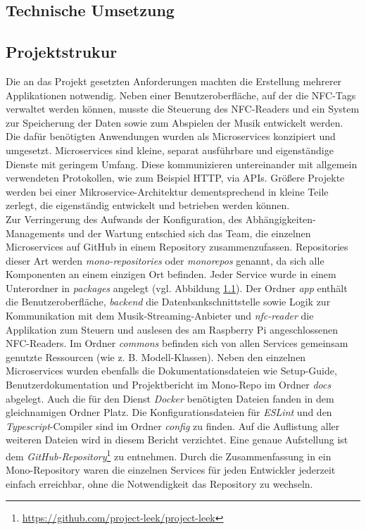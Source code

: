 \documentclass[10pt, a4paper]{article}
\begin{document}
\begin{onehalfspace}
\section{Technische Umsetzung}
  \subsection{Projektstrukur}
  \label{Ordnerstruktur}
  Die an das Projekt gesetzten Anforderungen machten die Erstellung mehrerer Applikationen notwendig. Neben einer Benutzeroberfläche, auf der die NFC-Tags
  verwaltet werden können, musste die Steuerung des NFC-Readers und ein System zur Speicherung der Daten sowie zum Abspielen der Musik entwickelt werden.
  Die dafür benötigten Anwendungen wurden als Microservices konzipiert und umgesetzt.
  Microservices sind kleine, separat ausführbare und eigenständige Dienste mit geringem Umfang.
  Diese kommunizieren untereinander mit allgemein verwendeten Protokollen, wie zum Beispiel HTTP, via APIs.
  Größere Projekte werden bei einer Mikroservice-Architektur dementsprechend in kleine Teile \glqq zerlegt\grqq ,
   die eigenständig entwickelt und betrieben werden können. \cite{Microservices}\\
  Zur Verringerung des Aufwands der Konfiguration, des Abhängigkeiten-Managements und der Wartung entschied sich das Team, die einzelnen Microservices auf GitHub in einem Repository zusammenzufassen. \cite{Monorepo}
  Repositories dieser Art werden \textit{mono-repositories} oder \textit{monorepos} genannt, da sich alle Komponenten an einem einzigen Ort befinden.
  Jeder Service wurde in einem Unterordner in \textit{packages} angelegt (vgl. Abbildung \ref*{Ordnerstruktur}). Der Ordner \textit{app} enthält die Benutzeroberfläche,
  \textit{backend} die Datenbankschnittstelle sowie Logik zur Kommunikation mit dem Musik-Streaming-Anbieter und \textit{nfc-reader} die Applikation zum Steuern und auslesen des am Raspberry Pi angeschlossenen NFC-Readers.
  Im Ordner \textit{commons} befinden sich von allen Services gemeinsam genutzte Ressourcen (wie z. B. Modell-Klassen).
  Neben den einzelnen Microservices wurden ebenfalls die Dokumentationsdateien wie Setup-Guide, Benutzerdokumentation und Projektbericht im Mono-Repo im Ordner \textit{docs} abgelegt.
  Auch die für den Dienst \textit{Docker} benötigten Dateien fanden in dem gleichnamigen Ordner Platz. Die Konfigurationsdateien für \textit{ESLint} und den \textit{Typescript}-Compiler sind im Ordner \textit{config} zu finden.
  Auf die Auflistung aller weiteren Dateien wird in diesem Bericht verzichtet. Eine genaue Aufstellung ist dem \textit{GitHub-Repository}\footnote{\url{https://github.com/project-leek/project-leek}} zu entnehmen.
  Durch die Zusammenfassung in ein Mono-Repository waren die einzelnen Services für jeden Entwickler jederzeit einfach erreichbar, ohne die Notwendigkeit das Repository zu wechseln.


\end{onehalfspace}
\end{document}
